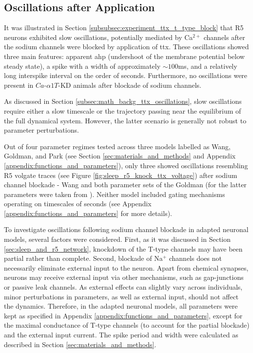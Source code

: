 \documentclass[../main.tex]{subfiles}
\begin{document}
\subsection{Oscillations after  Application}

\noindent It was illustrated in Section \ref{subsubsec:experiment_ttx_t_type_block} that R5 neurons exhibited slow oscillations, potentially mediated by Ca$^{2+}$ channels after the sodium channels were blocked by application of \gls{ttx}. These oscillations showed three main features: apparent \gls{ahp} (undershoot of the membrane potential below steady state), a spike with a width of approximately $\sim 100$ms, and a relatively long interspike interval on the order of seconds.
Furthermore, no oscillations were present in $Ca$-$\alpha 1T$-KD animals after blockade of sodium channels.

As discussed in Section \ref{subsec:math_backg_ttx_oscillations}, slow oscillations require either a slow timescale or the trajectory passing near the equilibrium of the full dynamical system. However, the latter scenario is generally not robust to parameter perturbations.

Out of four parameter regimes tested across three models labelled as Wang, Goldman, and Park (see Section \ref{sec:materials_and_methods} and Appendix \ref{appendix:functions_and_parameters}), only three showed oscillations resembling R5 volgate traces (see Figure \ref{fig:sleep_r5_knock_ttx_voltage}) after sodium channel blockade - Wang \parencite{wangMultipleDynamicalModes1994} and both parameter sets of the Goldman \parencite{goldmanGlobalStructureRobustness2001} (for the latter parameters were taken from \parencite{franciRobustTunableBursting2018}).
Neither model included gating mechanisms operating on timescales of seconds (see Appendix \ref{appendix:functions_and_parameters} for more details). 

To investigate oscillations following sodium channel blockade in adapted neuronal models, several factors were considered. First, as it was discussed in Section \ref{sec:sleep_and_r5_network}, knockdown of the T-type channels may have been partial rather than complete. Second, blockade of Na$^+$ channels does not necessarily eliminate external input to the neuron. Apart from chemical synapses, neurons may receive external input via other mechanisms, such as gap-junctions or passive leak channels. As external effects can slightly vary across individuals, minor perturbations in parameters, as well as external input, should not affect the dynamics.
Therefore, in the adapted neuronal models, all parameters were kept as specified in Appendix \ref{appendix:functions_and_parameters}, except for the maximal conductance of T-type channels (to account for the partial blockade) and the external input current. The spike period and width were calculated as described in Section \ref{sec:materials_and_methods}.
\end{document}
